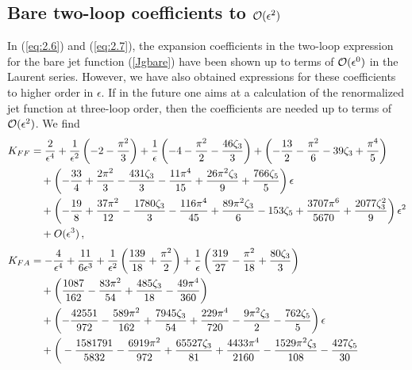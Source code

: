 \documentclass[12pt]{article}
\numberwithin{equation}{section}
\begin{document}
\begin{appendix}

\section{\boldmath Bare two-loop coefficients to ${\cal O}(\epsilon^2)$}
\label{app:A}
\renewcommand{\theequation}{A.\arabic{equation}}
\setcounter{equation}{0}

In (\ref{eq:2.6}) and (\ref{eq:2.7}), the expansion coefficients in the two-loop expression for the bare jet function (\ref{Jgbare}) have been shown up to terms of ${\cal O}(\epsilon^0)$ in the Laurent series. However, we have also obtained expressions for these coefficients to higher order in $\epsilon$. If in the future one aims at a calculation of the renormalized jet function at three-loop order, then the coefficients are needed up to terms of ${\cal O}(\epsilon^2)$. We find
\begin{align}
   K_{FF} &= \frac{2}{\epsilon ^4}+\frac{1}{\epsilon ^2}\left(-2-\frac{\pi ^2}{3}\right)
    +\frac{1}{\epsilon }\left(-4-\frac{\pi ^2}{2}-\frac{46 \zeta _3}{3}\right)
    +\left(-\frac{13}{2}-\frac{\pi^2}{6}-39 \zeta_3+\frac{\pi ^4}{5}\right) \notag\\
   &\quad +\left(-\frac{33}{4}+\frac{2 \pi ^2}{3}-\frac{431 \zeta _3}{3}-\frac{11 \pi ^4}{15}
    +\frac{26 \pi ^2 \zeta _3}{9}+\frac{766 \zeta_5}{5}\right) \epsilon \notag\\
   &\quad +\left(-\frac{19}{8}+\frac{37 \pi ^2}{12}-\frac{1780\zeta _3}{3} 
    -\frac{116 \pi ^4}{45} +\frac{89 \pi^2\zeta _3}{6}-153 \zeta _5
    +\frac{3707 \pi ^6}{5670}+\frac{2077 \zeta _3^2}{9}\right)\epsilon ^2 \notag\\
   &\quad +O(\epsilon^3) \,, \\[1mm]
%
   K_{FA} &= -\frac{4}{\epsilon ^4}+\frac{11}{6 \epsilon ^3}
    +\frac{1}{\epsilon ^2}\left(\frac{139}{18}
    +\frac{\pi ^2}{2}\right)+\frac{1}{\epsilon }\left(\frac{319}{27}
    -\frac{\pi^2}{18}+\frac{80 \zeta _3}{3}\right) \notag\\
   &\quad +\bigg(\frac{1087}{162}-\frac{83 \pi^2}{54}+\frac{485 \zeta _3}{18}-\frac{49 \pi ^4}{360}\bigg) \notag\\
   &\quad +\left(-\frac{42551}{972}-\frac{589 \pi ^2}{162}+\frac{7945\zeta _3}{54}
    +\frac{229 \pi^4}{720}-\frac{9 \pi ^2\zeta _3}{2} -\frac{762 \zeta _5}{5}\right) \epsilon \notag\\
   &\quad +\bigg(-\frac{1581791}{5832}-\frac{6919 \pi^2}{972}+\frac{65527\zeta _3}{81}
    +\frac{4433 \pi ^4}{2160}-\frac{1529 \pi^2\zeta _3}{108} -\frac{427 \zeta _5}{30} \notag\\

\end{align}
\end{appendix}
\end{document}
